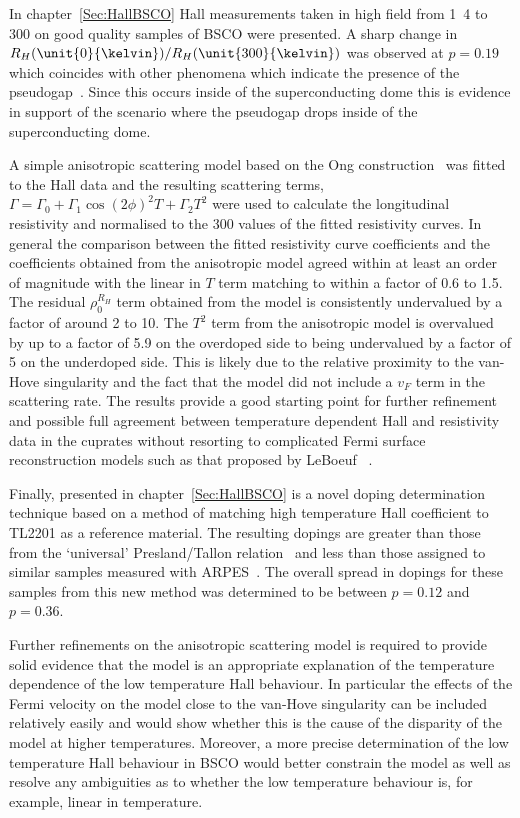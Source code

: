 In chapter~\ref{Sec:HallBSCO} Hall measurements taken in high field from \unit{1.4}{\kelvin} to \unit{300}{\kelvin} on good quality samples of \ac{BSCO} were presented. A sharp change in $R_H(\unit{0}{\kelvin})/R_H(\unit{300}{\kelvin})$ was observed at $p=0.19$ which coincides with other phenomena which indicate the presence of the pseudogap~\cite{Tallon2001}. Since this occurs inside of the superconducting dome this is evidence in support of the scenario where the pseudogap drops inside of the superconducting dome.

A simple anisotropic scattering model based on the Ong construction~\cite{Ong1991} was fitted to the Hall data and the resulting scattering terms, $\Gamma = \Gamma_0 + \Gamma_1 \cos(2\phi)^2 T + \Gamma_2 T^2$ were used to calculate the longitudinal resistivity and normalised to the \unit{300}{\kelvin} values of the fitted resistivity curves. In general the comparison between the fitted resistivity curve coefficients and the coefficients obtained from the anisotropic model agreed within at least an order of magnitude with the linear in $T$ term matching to within a factor of 0.6 to 1.5. The residual $\rho^{R_H}_0$ term obtained from the model is consistently undervalued by a factor of around 2 to 10. The $T^2$ term from the anisotropic model is overvalued by up to a factor of 5.9  on the overdoped side to being undervalued by a factor of 5 on the underdoped side. This is likely due to the relative proximity to the van-Hove singularity and the fact that the model did not include a $v_F$ term in the scattering rate. The results provide a good starting point for further refinement and possible full agreement between temperature dependent Hall and resistivity data in the cuprates without resorting to complicated Fermi surface reconstruction models such as that proposed by LeBoeuf \etal~\cite{LeBoeuf2011}.

Finally, presented in chapter~\ref{Sec:HallBSCO} is a novel doping determination technique based on a method of matching high temperature Hall coefficient to \ac{TL2201} as a reference material. The resulting dopings are greater than those from the `universal' Presland/Tallon relation~\cite{Presland1991} and less than those assigned to similar samples measured with \ac{ARPES}~\cite{Kondo2004}. The overall spread in dopings for these samples from this new method was determined to be between $p=0.12$ and $p=0.36$.

Further refinements on the anisotropic scattering model is required to provide solid evidence that the model is an appropriate explanation of the temperature dependence of the low temperature Hall behaviour. In particular the effects of the Fermi velocity on the model close to the van-Hove singularity can be included relatively easily and would show whether this is the cause of the disparity of the model at higher temperatures. Moreover, a more precise determination of the low temperature Hall behaviour in \ac{BSCO} would better constrain the model as well as resolve any ambiguities as to whether the low temperature behaviour is, for example, linear in temperature.
